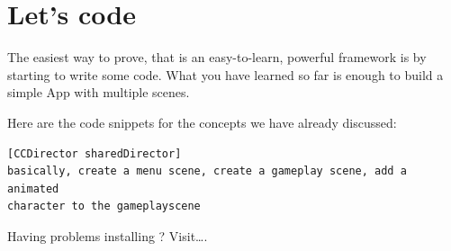 \section{Let's code}
The easiest way to prove, that \cocos{} is an easy-to-learn, powerful framework
is by starting to write some code. What you have learned so far is enough to
build a simple App with multiple scenes.

Here are the code snippets for the concepts we have already discussed:
\begin{lstlisting}[title=examples/introduction.clj]
[CCDirector sharedDirector]
basically, create a menu scene, create a gameplay scene, add a animated
character to the gameplayscene
\end{lstlisting} 


\begin{error}
Having problems installing \cocos{}? Visit\ldots.
\end{error}